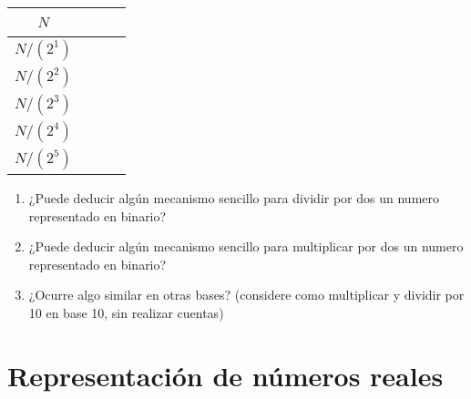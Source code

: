 \documentclass[12pt]{article}
\begin{document}
\begin{enumerate}
\begin{center}
\begin{tabular}[t]{|c|c|c|}
            \hline

                $N$ & \hspace{9em}~ &\hspace{9em}~\\

            \hline

                $N/(2^1)$ & ~ &~\\

            \hline

                $N/(2^2)$ & ~ &~\\

            \hline

                $N/(2^3)$ & ~ &~\\

            \hline

                $N/(2^4)$ & ~ &~\\

            \hline

                $N/(2^5)$ & ~ &~\\

            \hline

            \end{tabular}

        \end{center}

        \begin{enumerate}

            \item ¿Puede deducir algún mecanismo sencillo para dividir por dos un
                numero representado en binario?

            \item ¿Puede deducir algún mecanismo sencillo para multiplicar por dos un
                numero representado en binario?

            \item ¿Ocurre algo similar en otras bases? (considere como
                multiplicar y dividir por 10 en base 10, sin realizar cuentas)

        \end{enumerate}

\end{enumerate}

\section{Representación de números reales}
\end{document}
